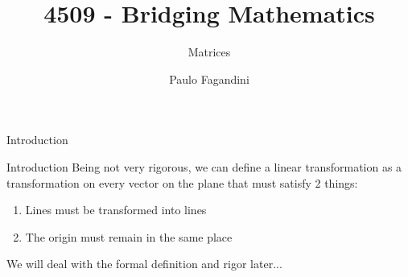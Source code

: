 \documentclass[aspectratio=169]{beamer}
\title[]{4509 - Bridging Mathematics}
\subtitle{Matrices}
\author[P. Fagandini]{Paulo Fagandini}
\institute{}
\date{}
\begin{document}
\begin{frame}{Introduction}
    \begin{center}
    \end{center}
\end{frame}

\begin{frame}{Introduction}
    Being not very rigorous, we can define a linear transformation as a transformation on every vector on the plane that must satisfy 2 things:
    \begin{enumerate}
        \item Lines must be transformed into lines
        \item The origin must remain in the same place
    \end{enumerate}
    We will deal with the formal definition and rigor later...
    
\end{frame}
\end{document}
